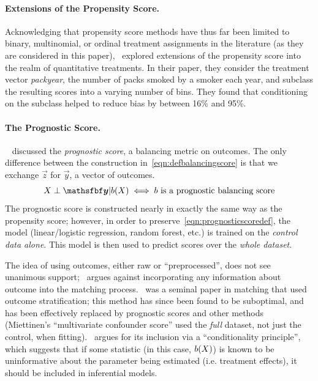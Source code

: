 \documentclass[11pt]{extarticle}
\begin{document}
\paragraph{Extensions of the Propensity Score.} Acknowledging that propensity score methods have thus far been limited to binary, multinomial, or ordinal treatment assignments in the literature (as they are considered in this paper),~\textcite{imai_causal_2004} explored extensions of the propensity score into the realm of quantitative treatments. In their paper, they consider the treatment vector \emph{packyear}, the number of packs smoked by a smoker each year, and subclass the resulting scores into a varying number of bins. They found that conditioning on the subclass helped to reduce bias by between 16\% and 95\%.

\paragraph{The Prognostic Score.}~\textcite{hansen_prognostic_2008} discussed the \emph{prognostic score}, a balancing metric on outcomes. The only difference between the construction in~\eqref{eqn:defbalancingscore} is that we exchange $\vec{z}$ for $\vec{y}$, a vector of outcomes.
\begin{equation}
  \mat{X} \perp \vec{y} | b(\mat{X}) \iff b \text{ is a prognostic balancing score} \label{eqn:prognosticscoredef}
\end{equation}
The prognostic score is constructed nearly in exactly the same way as the propensity score; however, in order to preserve~\eqref{eqn:prognosticscoredef}, the model (linear/logistic regression, random forest, etc.) is trained on the \emph{control data alone}. This model is then used to predict scores over the \emph{whole dataset}.

The idea of using outcomes, either raw or ``preprocessed'', does not see unanimous support;~\textcite{garrido_methods_2014} argues against incorporating any information about outcome into the matching process.~\textcite{miettinen_stratification_1976} was a seminal paper in matching that used outcome stratification; this method has since been found to be suboptimal, and has been effectively replaced by prognostic scores and other methods~\parencite{hansen_bias_2006} (Miettinen's ``multivariate confounder score'' used the \emph{full} dataset, not just the control, when fitting).~\textcite{hansen_bias_2006} argues for its inclusion via a ``conditionality principle'', which suggests that if some statistic (in this case, $b(X)$) is known to be uninformative about the parameter being estimated (i.e. treatment effects), it should be included in inferential models.
\end{document}
